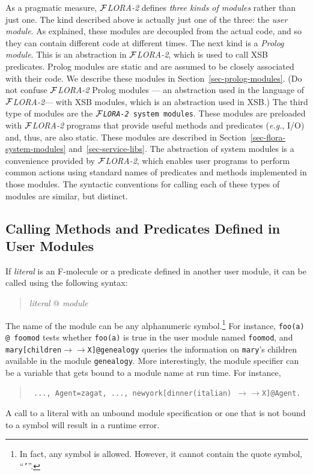 \documentclass[11pt]{article}
\newcommand{\mvd}{\ensuremath{{\rightarrow\!\!\!\!\rightarrow}}}  %
\newcommand{\FLORA}{{\mbox{${\cal F}${\small\it LORA}\rm\emph{-2}}}\xspace}
\begin{document}
As a pragmatic measure, \FLORA defines \emph{three kinds of modules} rather
than just one. The kind described above is actually just one of the three:
the \emph{user module}. As explained, these modules are decoupled from the
actual code, and so they can contain different code at different times.
The next kind is a \emph{Prolog module}. This is an abstraction in \FLORA,
which is used to call XSB predicates. Prolog modules are static and are
assumed to be closely associated with their code. We describe these modules
in Section~\ref{sec-prolog-modules}. (Do not confuse \FLORA Prolog modules
--- an abstraction used in the language of \FLORA --- with XSB modules,
which is an abstraction used in XSB.)  The third type of modules are the
{\tt \FLORA system modules}. These modules are preloaded with \FLORA
programs that provide useful methods and predicates ({\it e.g.}, I/O) and,
thus, are also static. These modules are described in
Section~\ref{sec-flora-system-modules} and~\ref{sec-service-libs}. The
abstraction of system modules is a convenience provided by \FLORA, which
enables user programs to perform common actions using standard names of
predicates and methods implemented in those modules. The syntactic
conventions for calling each of these types of modules are similar, but
distinct.


\subsection{Calling Methods and Predicates Defined in User Modules}


%
If \emph{literal} is an F-molecule or a predicate defined in another
user module, it can be called using the following syntax:
\begin{quote}
\emph{literal} @ \emph{module} 
\end{quote}
The name of the module can be any alphanumeric symbol.\footnote{
  In fact, any symbol is allowed. However, it cannot contain the quote
  symbol, ``{\tt '}''.
  }
For instance, \verb|foo(a) @ foomod| tests whether {\tt foo(a)} is true in
the user module named {\tt foomod}, and {\tt mary[children\mvd X]@genealogy}
queries the information on {\tt mary}'s children available in the module
{\tt genealogy}. More interestingly, the module specifier can be a variable
that gets bound to a module name at run time. For instance, 
\begin{quote}
 {\tt
   ..., Agent=zagat, ..., newyork[dinner(italian) \mvd X]@Agent.
   }
\end{quote}
A call to a literal with an unbound module specification or one that is not
bound to a symbol will result in a runtime error.
\end{document}
